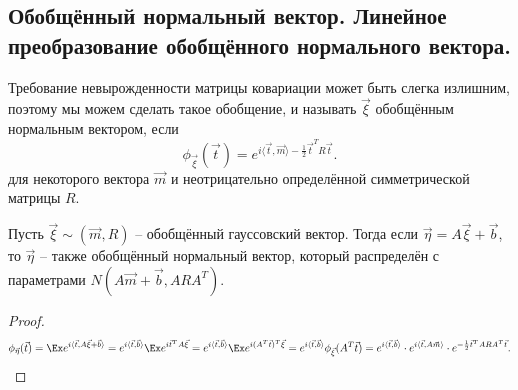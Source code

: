 \subsection{Обобщённый нормальный вектор. Линейное преобразование обобщённого нормального вектора.}
\begin{definition}
    Требование невырожденности матрицы ковариации может быть слегка излишним, поэтому мы можем сделать такое обобщение, и называть $\vec{\xi}$ обобщённым нормальным вектором, если
    \[
        \phi_{\vec{\xi}}(\vec{t}) = e^{i \langle \vec{t}, \vec{m} \rangle - \frac{1}{2}\vec{t}^T R \vec{t}}.
    \]
    для некоторого вектора $\vec{m}$ и неотрицательно определённой симметрической матрицы $R$.
\end{definition}
\begin{lemma}
    Пусть $\vec{\xi} \sim (\vec{m}, R)$ -- обобщённый гауссовский вектор. Тогда если $\vec{\eta} = A\vec{\xi} + \vec{b}$, то
    $\vec{\eta}$ -- также обобщённый нормальный вектор, который распределён с параметрами $N(A\vec{m} + \vec{b}, ARA^T)$.
\end{lemma}
\begin{proof}
    \[
        \phi_{\vec{\eta}}(\vec{t}) = \Ex e^{i \langle \vec{t}, A\vec{\xi} + \vec{b} \rangle} = e^{i\langle \vec{t}, \vec{b} \rangle} \Ex e^{i \vec{t}^T A \vec{\xi}} = e^{i\langle \vec{t}, \vec{b} \rangle} \Ex e^{i (A^T\vec{t})^T \vec{\xi}}
        = e^{i \langle \vec{t}, \vec{b} \rangle} \phi_{\vec{\xi}}(A^T \vec{t}) = e^{i \langle \vec{t}, \vec{b} \rangle} \cdot e^{i \langle \vec{t}, A\vec{m} \rangle} \cdot e^{-\frac{1}{2} \vec{t}^T ARA^T \vec{t}}.
    \]
\end{proof}